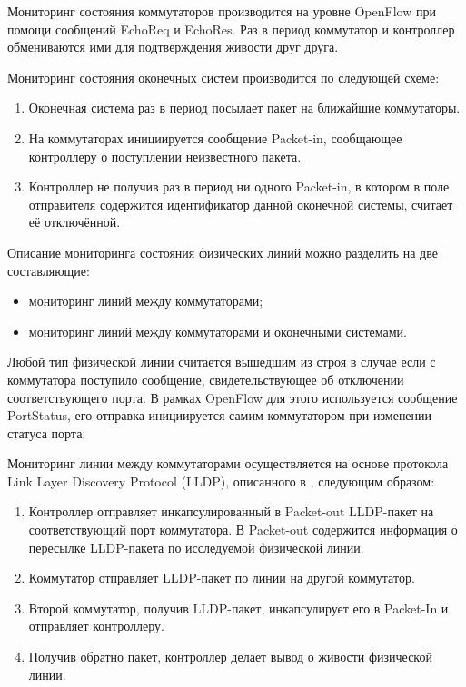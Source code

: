 \documentclass[12pt, a4paper]{article}
\begin{document}
Мониторинг состояния коммутаторов производится на уровне OpenFlow при помощи сообщений EchoReq и EchoRes. Раз в период коммутатор и контроллер обмениваются ими для подтверждения живости друг друга.

Мониторинг состояния оконечных систем производится по следующей схеме:
\begin{enumerate}
	\item Оконечная система раз в период посылает пакет на ближайшие коммутаторы.
	\item На коммутаторах инициируется сообщение Packet-in, сообщающее контроллеру о поступлении неизвестного пакета.
	\item Контроллер не получив раз в период ни одного Packet-in, в котором в поле отправителя содержится идентификатор данной оконечной системы, считает её отключённой.
\end{enumerate}


Описание мониторинга состояния физических линий можно разделить на две составляющие: 
\begin{itemize}
	\item мониторинг линий между коммутаторами;
	\item мониторинг линий между коммутаторами и оконечными системами.
\end{itemize}

Любой тип физической линии считается вышедшим из строя в случае если с коммутатора поступило сообщение, свидетельствующее об отключении соответствующего порта. В рамках OpenFlow для этого используется сообщение PortStatus, его отправка инициируется самим коммутатором при изменении статуса порта.

Мониторинг линии между коммутаторами осуществляется на основе протокола Link Layer Discovery Protocol (LLDP), описанного в \cite{monitor2}, следующим образом:
\begin{enumerate}
	\item Контроллер отправляет инкапсулированный в Packet-out LLDP-пакет на соответствующий порт коммутатора. В Packet-out содержится информация о пересылке LLDP-пакета по исследуемой физической линии.
	\item Коммутатор отправляет LLDP-пакет по линии на другой коммутатор.
	\item Второй коммутатор, получив LLDP-пакет, инкапсулирует его в Packet-In и отправляет контроллеру.
	\item Получив обратно пакет, контроллер делает вывод о живости физической линии.
\end{enumerate}
\end{document}
